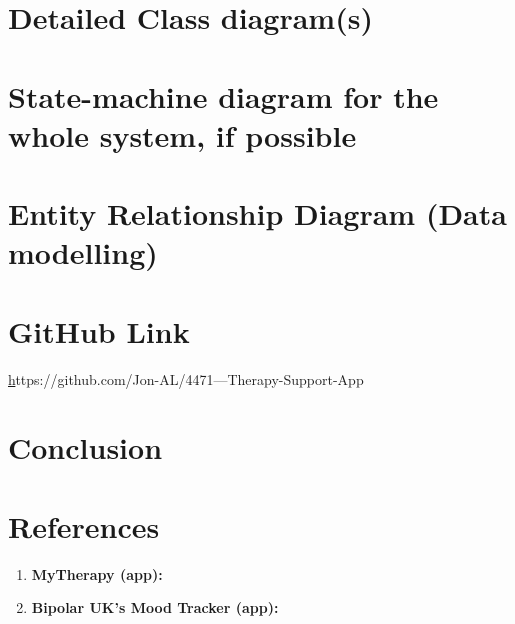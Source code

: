 \documentclass[11pt]{article}
\begin{document}
    \section{Detailed Class diagram(s)}\label{sec:detailed-class-diagram(s)}


    \section{State-machine diagram {for the whole system, if possible}}\label{sec:state-machine-diagram}


    \section{Entity Relationship Diagram (Data modelling)}\label{sec:er--diagram-(data-modelling)}


    \section{GitHub Link}\label{sec:github-link}
    \href{Group Therapy-Support-App}
    https://github.com/Jon-AL/4471---Therapy-Support-App


    \section{Conclusion}\label{sec:conclusion}


    \section{References}\label{sec:reference}

    \begin{enumerate}
        \item \textbf{MyTherapy (app):} \cite{MyTherapy}
        \item \textbf{Bipolar UK’s Mood Tracker (app):} \cite{BiPolUK}
    \end{enumerate}

    

    \printbibliography[heading=subbibintoc]



    \begin{figure}
        \label{fig:Gant Chart}
    \end{figure}
\end{document}
